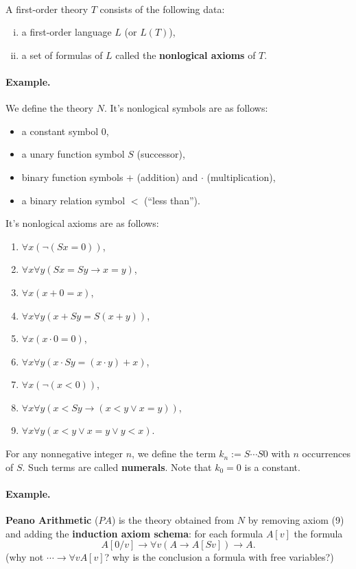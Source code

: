 \documentclass[12pt]{article}
\newlength{\myparskip}
\newenvironment{fullbox}{\begin{lrbox}{\savefullbox}\begin{minipage}{\dimexpr\textwidth-2\fboxsep\relax}\setlength{\parskip}{\myparskip}}{\end{minipage}\end{lrbox}\framebox[\textwidth]{\usebox{\savefullbox}}}
\newenvironment{pbox}[1][]{\begin{fullbox}\def\temp{#1}\ifx\temp\empty\else\paragraph{#1}\phantom{}\fi}{\end{fullbox}}
\theoremstyle{definition}
\newcommand{\<}{\langle}
\renewcommand{\>}{\rangle}
\newcommand{\keyword}{\textbf}
\begin{document}
\newpage

\begin{pbox}
    A first-order theory $T$ consists of the following data:
    \begin{enumerate}[(i)]
        \item a first-order language $L$ (or $L(T)$),
        \item a set of formulas of $L$ called the \keyword{nonlogical axioms} of $T$.
    \end{enumerate}
\end{pbox}

\begin{pbox}[Example.]
    We define the theory $N$.
    It's nonlogical symbols are as follows:
    \begin{itemize}
        \item a constant symbol $0$,
        \item a unary function symbol $S$ (successor),
        \item binary function symbols $+$ (addition) and $\cdot$ (multiplication),
        \item a binary relation symbol $<$ (``less than'').
    \end{itemize}
    It's nonlogical axioms are as follows:
    \begin{enumerate}[(1)]
        \item $\forall x (\lnot (Sx = 0))$,
        \item $\forall x \forall y (Sx = Sy \to x = y)$,
        \item $\forall x (x + 0 = x)$,
        \item $\forall x \forall y (x + Sy = S(x + y))$,
        \item $\forall x (x \cdot 0 = 0)$,
        \item $\forall x \forall y (x \cdot Sy = (x \cdot y) + x)$,
        \item $\forall x (\lnot(x < 0))$,
        \item $\forall x \forall y (x < Sy \to (x < y \lor x = y))$,
        \item $\forall x \forall y (x < y \lor x = y \lor y < x)$.
    \end{enumerate}

    For any nonnegative integer $n$, we define the term $k_n := S \cdots S0$ with $n$ occurrences of $S$.
    Such terms are called \keyword{numerals}.
    Note that $k_0 = 0$ is a constant. 
\end{pbox}

\begin{pbox}[Example.]
    \keyword{Peano Arithmetic} ($PA$) is the theory obtained from $N$ by removing axiom (9) and adding the \keyword{induction axiom schema}: for each formula $A[v]$ the formula
    \[
        A[0/v] \to \forall v (A \to A[Sv]) \to A.
    \]
    (why not $\cdots \to \forall v A[v]$? why is the conclusion a formula with free variables?)
\end{pbox}
\end{document}
